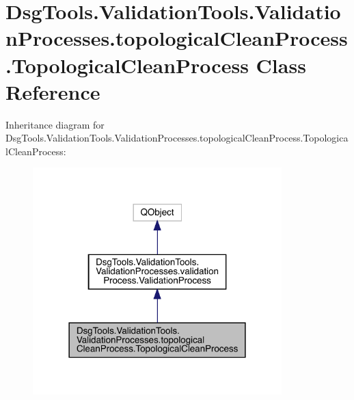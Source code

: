 \hypertarget{class_dsg_tools_1_1_validation_tools_1_1_validation_processes_1_1topological_clean_process_1_1_topological_clean_process}{}\section{Dsg\+Tools.\+Validation\+Tools.\+Validation\+Processes.\+topological\+Clean\+Process.\+Topological\+Clean\+Process Class Reference}
\label{class_dsg_tools_1_1_validation_tools_1_1_validation_processes_1_1topological_clean_process_1_1_topological_clean_process}


Inheritance diagram for Dsg\+Tools.\+Validation\+Tools.\+Validation\+Processes.\+topological\+Clean\+Process.\+Topological\+Clean\+Process\+:
\nopagebreak
\begin{figure}[H]
\begin{center}
\leavevmode
\includegraphics[width=273pt]{class_dsg_tools_1_1_validation_tools_1_1_validation_processes_1_1topological_clean_process_1_1_t92c020848da2d8726cc934e67cf66350}
\end{center}
\end{figure}


